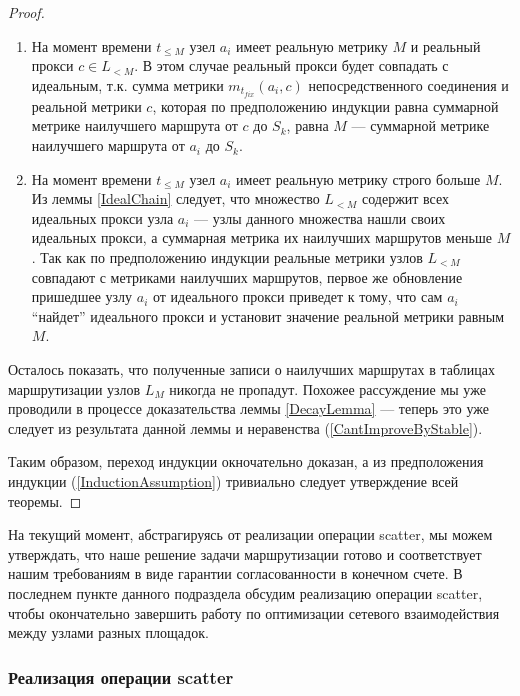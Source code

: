 \documentclass{article}
\theoremstyle{plain}
\theoremstyle{plain}
\theoremstyle{plain}
\theoremstyle{plain}
\theoremstyle{definition}
\theoremstyle{remark}
\theoremstyle{plain}
\begin{document}
\begin{proof}
    \begin{enumerate}
        \item На момент времени $t_{\leq M}$ узел $a_i$ имеет реальную метрику $M$ и реальный прокси $c \in L_{< M}$. В этом случае реальный прокси будет совпадать с идеальным, т.к. сумма метрики $m_{t_{fix}}(a_i, c)$ непосредственного соединения и реальной метрики $c$, которая по предположению индукции равна суммарной метрике наилучшего маршрута от $c$ до $S_k$, равна $M$ --- суммарной метрике наилучшего маршрута от $a_i$ до $S_k$.
        
        \item На момент времени $t_{\leq M}$ узел $a_i$ имеет реальную метрику строго больше $M$. Из леммы \ref{IdealChain} следует, что множество $L_{< M}$ содержит всех идеальных прокси узла $a_i$ --- узлы данного множества нашли своих идеальных прокси, а суммарная метрика их наилучших маршрутов меньше $M$. Так как по предположению индукции реальные метрики узлов $L_{< M}$ совпадают с метриками наилучших маршрутов, первое же обновление пришедшее узлу $a_i$ от идеального прокси приведет к тому, что сам $a_i$ \enquote{найдет} идеального прокси и установит значение реальной метрики равным $M$.
    \end{enumerate}
    
    Осталось показать, что полученные записи о наилучших маршрутах в таблицах маршрутизации узлов $L_M$ никогда не пропадут. Похожее рассуждение мы уже проводили в процессе доказательства леммы \ref{DecayLemma} --- теперь это уже следует из результата данной леммы и неравенства (\ref{CantImproveByStable}).
    
    Таким образом, переход индукции окночательно доказан, а из предположения индукции (\ref{InductionAssumption}) тривиально следует утверждение всей теоремы.
\end{proof}

На текущий момент, абстрагируясь от реализации операции scatter, мы можем утверждать, что наше решение задачи маршрутизации готово и соответствует нашим требованиям в виде гарантии согласованности в конечном счете. В последнем пункте данного подраздела обсудим реализацию операции scatter, чтобы окончательно завершить работу по оптимизации сетевого взаимодействия между узлами разных площадок.

\subsubsection{Реализация операции scatter}
\label{ScatterImplementation}
\end{document}
